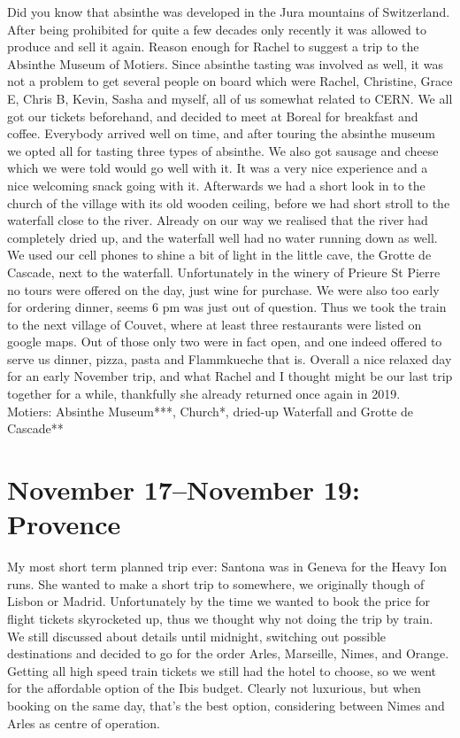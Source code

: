 Did you know that absinthe was developed in the Jura mountains of Switzerland. After being prohibited for quite a few decades only recently it was allowed to produce and sell it again. Reason enough for Rachel to suggest a trip to the Absinthe Museum of Motiers. Since absinthe tasting was involved as well, it was not a problem to get several people on board which were Rachel, Christine, Grace E, Chris B, Kevin, Sasha and myself, all of us somewhat related to CERN. We all got our tickets beforehand, and decided to meet at Boreal for breakfast and coffee. Everybody arrived well on time, and after touring the absinthe museum we opted all for tasting three types of absinthe. We also got sausage and cheese which we were told would go well with it. It was a very nice experience and a nice welcoming snack going with it. Afterwards we had a short look in to the church of the village with its old wooden ceiling, before we had short stroll to the waterfall close to the river. Already on our way we realised that the river had completely dried up, and the waterfall well had no water running down as well. We used our cell phones to shine a bit of light in the little cave, the Grotte de Cascade, next to the waterfall. Unfortunately in the winery of Prieure St Pierre no tours were offered on the day, just wine for purchase. We were also too early for ordering dinner, seems 6 pm was just out of question. Thus we took the train to the next village of Couvet, where at least three restaurants were listed on google maps. Out of those only two were in fact open, and one indeed offered to serve us dinner, pizza, pasta and Flammkueche that is. Overall a nice relaxed day for an early November trip, and what Rachel and I thought might be our last trip together for a while, thankfully she already returned once again in 2019.\\

Motiers: Absinthe Museum***, Church*, dried-up Waterfall and Grotte de Cascade**

\section{November 17--November 19: Provence}
\label{Provence2018}

My most short term planned trip ever: Santona was in Geneva for the Heavy Ion runs. She wanted to make a short trip to somewhere, we originally though of Lisbon or Madrid. Unfortunately by the time we wanted to book the price for flight tickets skyrocketed up, thus we thought why not doing the trip by train. We still discussed about details until midnight, switching out possible destinations and decided to go for the order Arles, Marseille, Nimes, and Orange. Getting all high speed train tickets we still had the hotel to choose, so we went for the affordable option of the Ibis budget. Clearly not luxurious, but when booking on the same day, that's the best option, considering between Nimes and Arles as centre of operation.\\

